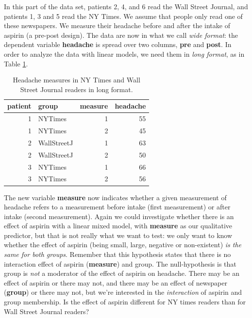 \documentclass[]{book}\usepackage[]{graphicx}\usepackage[]{color}
\begin{document}
In this part of the data set, patients 2, 4, and 6 read the Wall Street Journal, and patients 1, 3 and 5 read the NY Times. We assume that people only read one of these newspapers. We measure their headache before and after the intake of aspirin (a pre-post design). The data are now in what we call \textit{wide format}: the dependent variable \textbf{headache} is spread over two columns, \textbf{pre} and \textbf{post}. In order to analyze the data with linear models, we need them in \textit{long format}, as in Table \ref{tab:analysisprepostmixed2}. 

\begin{table}[ht]
\centering
\caption{Headache measures in NY Times and Wall Street Journal readers in long format.} 
\label{tab:analysisprepostmixed2}
\begin{tabular}{rlrr}
  \hline
patient & group & measure & headache \\ 
  \hline
1 & NYTimes & 1 & 55 \\ 
  1 & NYTimes & 2 & 45 \\ 
  2 & WallStreetJ & 1 & 63 \\ 
  2 & WallStreetJ & 2 & 50 \\ 
  3 & NYTimes & 1 & 66 \\ 
  3 & NYTimes & 2 & 56 \\ 
   \hline
\end{tabular}
\end{table}



The new variable \textbf{measure} now indicates whether a given measurement of headache refers to a measurement before intake (first measurement) or after intake (second measurement). Again we could investigate whether there is an effect of aspirin with a linear mixed model, with \textbf{measure} as our qualitative predictor, but that is not really what we want to test: we only want to know whether the effect of aspirin (being small, large, negative or non-existent) \textit{is the same for both groups}. Remember that this hypothesis states that there is no interaction effect of aspirin (\textbf{measure}) and group. The null-hypothesis is that group is \textit{not} a moderator of the effect of aspirin on headache. There may be an effect of aspirin or there may not, and there may be an effect of newspaper (\textbf{group}) or there may not, but we're interested in the \textit{interaction} of aspirin and group membership. Is the effect of aspirin different for NY times readers than for Wall Street Journal readers?
\end{document}
